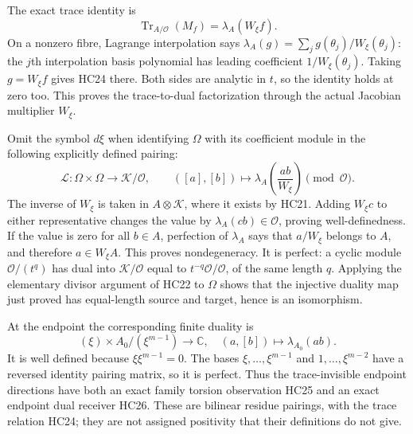 \documentclass[11pt,a4paper]{article}
\theoremstyle{definition}\newtheorem{definition}[theorem]{Definition}
\begin{document}
The exact trace identity is
\[
 \operatorname{Tr}_{A/\mathcal O}(M_f)
       =\lambda_A(W_\xi f).
 \tag{HC24}
\]
On a nonzero fibre, Lagrange interpolation says
$\lambda_A(g)=\sum_j g(\theta_j)/W_\xi(\theta_j)$:
the $j$th interpolation basis polynomial has leading coefficient
$1/W_\xi(\theta_j)$. Taking $g=W_\xi f$ gives HC24 there.
Both sides are analytic in $t$, so the identity holds at zero too.
This proves the trace-to-dual factorization through the actual
Jacobian multiplier $W_\xi$.

Omit the symbol $d\xi$ when identifying $\Omega$ with its coefficient
module in the following explicitly defined pairing:
\[
 \mathscr L:\Omega\times\Omega\longrightarrow\mathcal K/\mathcal O,
 \qquad([a],[b])\longmapsto
      \lambda_A\left(\frac{ab}{W_\xi}\right)\pmod{\mathcal O}.
 \tag{HC25}
\]
The inverse of $W_\xi$ is taken in $A\otimes\mathcal K$, where
it exists by HC21. Adding $W_\xi c$ to either representative
changes the value by $\lambda_A(cb)\in\mathcal O$, proving
well-definedness. If the value is zero for all $b\in A$, perfection
of $\lambda_A$ says that $a/W_\xi$ belongs to $A$, and therefore
$a\in W_\xi A$. This proves nondegeneracy. It is perfect: a
cyclic module $\mathcal O/(t^q)$ has dual into
$\mathcal K/\mathcal O$ equal to $t^{-q}\mathcal O/\mathcal O$,
of the same length $q$. Applying the elementary divisor argument
of HC22 to $\Omega$ shows that the injective duality map just
proved has equal-length source and target, hence is an isomorphism.

At the endpoint the corresponding finite duality is
\[
 (\xi)\times A_0/(\xi^{m-1})\longrightarrow\mathbb C,
           \quad(a,[b])\longmapsto\lambda_{A_0}(ab).
 \tag{HC26}
\]
It is well defined because $\xi\xi^{m-1}=0$. The bases
$\xi,\ldots,\xi^{m-1}$ and $1,\ldots,\xi^{m-2}$ have a
reversed identity pairing matrix, so it is perfect. Thus the
trace-invisible endpoint directions have both an exact family
torsion observation HC25 and an exact endpoint dual receiver HC26.
These are bilinear residue pairings, with the trace relation HC24;
they are not assigned positivity that their definitions do not give.
\end{document}
